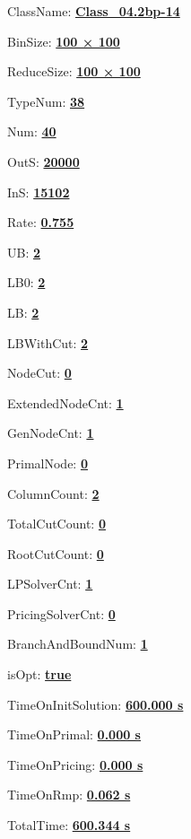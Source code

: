 \documentclass[11pt]{article}
\begin{document}
\pagestyle{empty}


ClassName: \underline{\textbf{Class_04.2bp-14}}
\par
BinSize: \underline{\textbf{100 × 100}}
\par
ReduceSize: \underline{\textbf{100 × 100}}
\par
TypeNum: \underline{\textbf{38}}
\par
Num: \underline{\textbf{40}}
\par
OutS: \underline{\textbf{20000}}
\par
InS: \underline{\textbf{15102}}
\par
Rate: \underline{\textbf{0.755}}
\par
UB: \underline{\textbf{2}}
\par
LB0: \underline{\textbf{2}}
\par
LB: \underline{\textbf{2}}
\par
LBWithCut: \underline{\textbf{2}}
\par
NodeCut: \underline{\textbf{0}}
\par
ExtendedNodeCnt: \underline{\textbf{1}}
\par
GenNodeCnt: \underline{\textbf{1}}
\par
PrimalNode: \underline{\textbf{0}}
\par
ColumnCount: \underline{\textbf{2}}
\par
TotalCutCount: \underline{\textbf{0}}
\par
RootCutCount: \underline{\textbf{0}}
\par
LPSolverCnt: \underline{\textbf{1}}
\par
PricingSolverCnt: \underline{\textbf{0}}
\par
BranchAndBoundNum: \underline{\textbf{1}}
\par
isOpt: \underline{\textbf{true}}
\par
TimeOnInitSolution: \underline{\textbf{600.000 s}}
\par
TimeOnPrimal: \underline{\textbf{0.000 s}}
\par
TimeOnPricing: \underline{\textbf{0.000 s}}
\par
TimeOnRmp: \underline{\textbf{0.062 s}}
\par
TotalTime: \underline{\textbf{600.344 s}}
\par
\newpage
\end{document}
